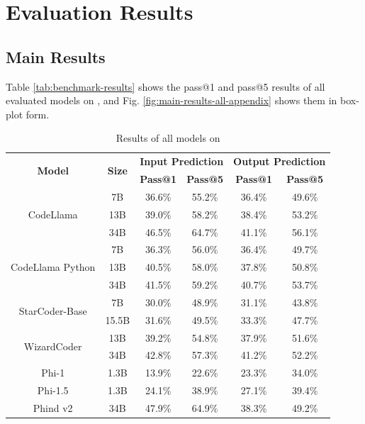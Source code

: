 \section{Evaluation Results} \label{sec:appendix-quantitative}

\subsection{Main Results}
Table \ref{tab:benchmark-results} shows the pass@1 and pass@5 results of all evaluated models on \benchmark, and Fig. \ref{fig:main-results-all-appendix} shows them in box-plot form.

\begin{table}[htbp]
    \centering
    \caption{Results of all models on \benchmark}
    \begin{tabular}{cccccc}
        \toprule
        \multirow{2}{*}{\textbf{Model}} & \multirow{2}{*}{\textbf{Size}} & \multicolumn{2}{c}{\textbf{Input Prediction}} & \multicolumn{2}{c}{\textbf{Output Prediction}} \\
        \cmidrule(lr){3-4} \cmidrule(lr){5-6}
        & & \textbf{Pass@1} & \textbf{Pass@5} & \textbf{Pass@1} & \textbf{Pass@5} \\
	\midrule
	\multirow{3}{*}{CodeLlama}
	& 7B & 36.6\% & 55.2\% & 36.4\% & 49.6\% \\
	& 13B & 39.0\% & 58.2\% & 38.4\% & 53.2\% \\
	& 34B & 46.5\% & 64.7\% & 41.1\% & 56.1\% \\
	\midrule
	\multirow{3}{*}{CodeLlama Python}
	& 7B & 36.3\% & 56.0\% & 36.4\% & 49.7\% \\
	& 13B & 40.5\% & 58.0\% & 37.8\% & 50.8\% \\
	& 34B & 41.5\% & 59.2\% & 40.7\% & 53.7\% \\
	\midrule
	\multirow{2}{*}{StarCoder-Base}
	& 7B & 30.0\% & 48.9\% & 31.1\% & 43.8\% \\
	& 15.5B & 31.6\% & 49.5\% & 33.3\% & 47.7\% \\
	\midrule
	\multirow{2}{*}{WizardCoder}
	& 13B & 39.2\% & 54.8\% & 37.9\% & 51.6\% \\
	& 34B & 42.8\% & 57.3\% & 41.2\% & 52.2\% \\
	\midrule
	Phi-1
	& 1.3B & 13.9\% & 22.6\% & 23.3\% & 34.0\% \\
	\midrule
	Phi-1.5
	& 1.3B & 24.1\% & 38.9\% & 27.1\% & 39.4\% \\
	\midrule
	Phind v2
	& 34B & 47.9\% & 64.9\% & 38.3\% & 49.2\% \\

\end{tabular}
\end{table}
